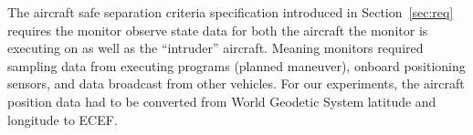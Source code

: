  The aircraft safe separation criteria specification introduced in
  Section~\ref{sec:req} requires the monitor observe state data for
  both the aircraft the monitor is executing on as well as the
  ``intruder'' aircraft.  Meaning monitors required sampling data from
  executing programs (planned maneuver), onboard positioning sensors,
  and data broadcast from other vehicles.  For our experiments, the
  aircraft position data had to be converted from World Geodetic
  System latitude and longitude to ECEF.

  

